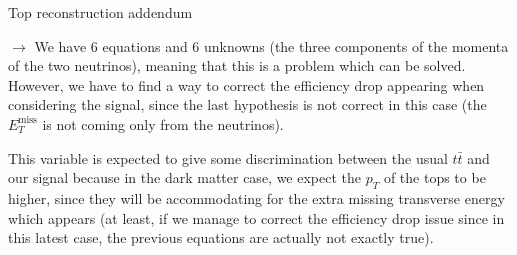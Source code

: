 \documentclass[8 pt]{beamer}
\begin{document}
\begin{frame}{Top reconstruction addendum}
	\vspace{13pt}

	\justifying
	$\rightarrow$ We have 6 equations and 6 unknowns (the three components of the momenta of the two neutrinos), meaning that this is a problem which can be solved. However, we have to find a way to correct the efficiency drop appearing when considering the signal, since the last hypothesis is not correct in this case (the $E_T^{\text{miss}}$ is not coming only from the neutrinos). \vfill
	
	\begin{block}{}
   	\justifying
	\vspace{5pt}
	This variable is expected to give some discrimination between the usual $t \bar t$ and our signal because in the dark matter case, we expect the $p_T$ of the tops to be higher, since they will be accommodating for the extra missing transverse energy which appears (at least, if we manage to correct the efficiency drop issue since in this latest case, the previous equations are actually not exactly true). \vspace{5pt}
	\end{block} \vfill

\end{frame}
\end{document}
